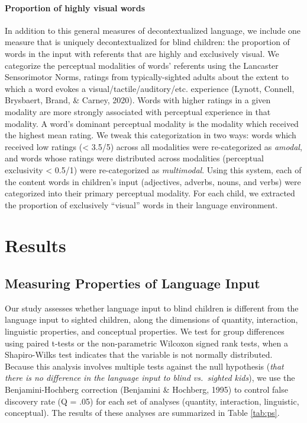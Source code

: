 \documentclass[
  man]{apa6}
\let\oldparagraph\paragraph
\renewcommand{\paragraph}[1]{\oldparagraph{#1}\mbox{}}
\begin{document}
\hypertarget{proportion-of-highly-visual-words}{%
\paragraph{Proportion of highly visual words}\label{proportion-of-highly-visual-words}}

In addition to this general measures of decontextualized language, we include one measure that is uniquely decontextualized for blind children: the proportion of words in the input with referents that are highly and exclusively visual. We categorize the perceptual modalities of words' referents using the Lancaster Sensorimotor Norms, ratings from typically-sighted adults about the extent to which a word evokes a visual/tactile/auditory/etc. experience (Lynott, Connell, Brysbaert, Brand, \& Carney, 2020). Words with higher ratings in a given modality are more strongly associated with perceptual experience in that modality. A word's dominant perceptual modality is the modality which received the highest mean rating. We tweak this categorization in two ways: words which received low ratings (\textless{} 3.5/5) across all modalities were re-categorized as \emph{amodal}, and words whose ratings were distributed across modalities (perceptual exclusivity \textless{} 0.5/1) were re-categorized as \emph{multimodal}. Using this system, each of the content words in children's input (adjectives, adverbs, nouns, and verbs) were categorized into their primary perceptual modality. For each child, we extracted the proportion of exclusively ``visual'' words in their language environment.

\hypertarget{results}{%
\section{Results}\label{results}}

\hypertarget{measuring-properties-of-language-input}{%
\subsection{Measuring Properties of Language Input}\label{measuring-properties-of-language-input}}

Our study assesses whether language input to blind children is different from the language input to sighted children, along the dimensions of quantity, interaction, linguistic properties, and conceptual properties. We test for group differences using paired t-tests or the non-parametric Wilcoxon signed rank tests, when a Shapiro-Wilks test indicates that the variable is not normally distributed. Because this analysis involves multiple tests against the null hypothesis (\emph{that there is no difference in the language input to blind vs.~sighted kids}), we use the Benjamini-Hochberg correction (Benjamini \& Hochberg, 1995) to control false discovery rate (Q = .05) for each set of analyses (quantity, interaction, linguistic, conceptual). The results of these analyses are summarized in Table \ref{tab:ps}.
\end{document}

